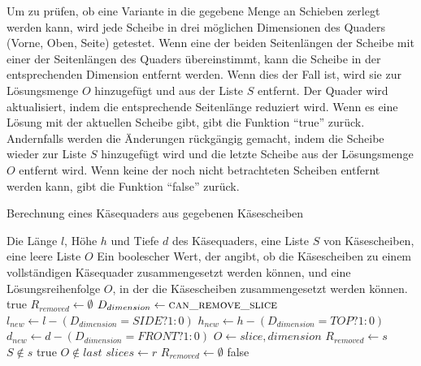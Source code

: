 \documentclass[a4paper,10pt,ngerman]{scrartcl}
\begin{document}
    Um zu prüfen, ob eine Variante in die gegebene Menge an Schieben zerlegt werden kann, wird jede
    Scheibe in drei möglichen Dimensionen des Quaders (Vorne, Oben, Seite) getestet.
    Wenn eine der beiden Seitenlängen der Scheibe mit einer der Seitenlängen des Quaders übereinstimmt,
    kann die Scheibe in der entsprechenden Dimension entfernt werden.
    Wenn dies der Fall ist, wird sie zur Lösungsmenge $O$ hinzugefügt und aus der Liste $S$ entfernt.
    Der Quader wird aktualisiert, indem die entsprechende Seitenlänge reduziert wird.
    Wenn es eine Lösung mit der aktuellen Scheibe gibt, gibt die Funktion ``true'' zurück.
    Andernfalls werden die Änderungen rückgängig gemacht, indem die Scheibe wieder zur Liste $S$ hinzugefügt wird
    und die letzte Scheibe aus der Lösungsmenge $O$ entfernt wird.
    Wenn keine der noch nicht betrachteten Scheiben entfernt werden kann, gibt die Funktion ``false'' zurück.

    \begin{algorithm}[H]
        \caption{Berechnung eines Käsequaders aus gegebenen Käsescheiben}
        \begin{algorithmic}
            \Require Die Länge $l$, Höhe $h$ und Tiefe $d$ des Käsequaders, eine Liste $S$ von Käsescheiben, eine leere Liste $O$
            \Ensure Ein boolescher Wert, der angibt, ob die Käsescheiben zu einem vollständigen Käsequader zusammengesetzt werden können,
            und eine Lösungsreihenfolge $O$, in der die Käsescheiben zusammengesetzt werden können.
                    \State \Return true
                \EndIf
                \State $R_{removed} \gets \emptyset$
                    \State $D_{dimension} \gets \textsc{can\_remove\_slice}$
                        \State $l_{new} \gets l - (D_{dimension} = SIDE ? 1 : 0)$
                        \State $h_{new}  \gets h - (D_{dimension} = TOP ? 1 : 0)$
                        \State $d_{new}  \gets d - (D_{dimension} = FRONT ? 1 : 0)$
                        \State $O \gets {slice, dimension}$
                        \State $R_{removed} \gets s$
                        \State $S \notin s$
                    \EndIf
                        \State \Return true
                    \Else
                        \State $O \notin last$
                            \State $slices \gets r$
                        \EndFor
                        \State $R_{removed} \gets \emptyset$
                        \EndElse
                    \EndIf
                \EndFor
                \State \Return false
            \EndFunction
        \end{algorithmic}\label{alg:pseudo_greedy}
    \end{algorithm}
\end{document}
